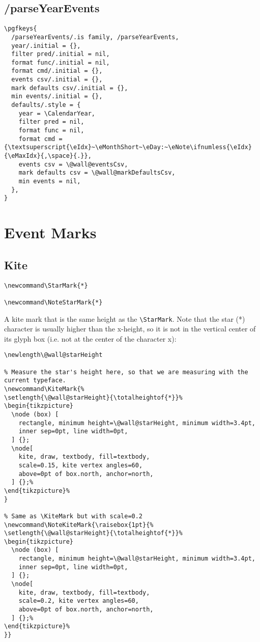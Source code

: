 \documentclass[11pt,oneside]{memoir-article}
\begin{document}
\section{/parseYearEvents}
\label{sec:org3b4e036}

\begin{verbatim}
\pgfkeys{
  /parseYearEvents/.is family, /parseYearEvents,
  year/.initial = {},
  filter pred/.initial = nil,
  format func/.initial = nil,
  format cmd/.initial = {},
  events csv/.initial = {},
  mark defaults csv/.initial = {},
  min events/.initial = {},
  defaults/.style = {
    year = \CalendarYear,
    filter pred = nil,
    format func = nil,
    format cmd = {\textsuperscript{\eIdx}~\eMonthShort~\eDay:~\eNote\ifnumless{\eIdx}{\eMaxIdx}{,\space}{.}},
    events csv = \@wall@eventsCsv,
    mark defaults csv = \@wall@markDefaultsCsv,
    min events = nil,
  },
}
\end{verbatim}

\chapter{Event Marks}
\label{sec:org9c1a6a1}
\section{Kite}
\label{sec:orgb28c6c4}

\begin{verbatim}
\newcommand\StarMark{*}

\newcommand\NoteStarMark{*}
\end{verbatim}

A kite mark that is the same height as the \texttt{\textbackslash{}StarMark}. Note that the star (*)
character is usually higher than the x-height, so it is not in the vertical
center of its glyph box (i.e. not at the center of the character x):

 \frame{*}

\begin{verbatim}
\newlength\@wall@starHeight

% Measure the star's height here, so that we are measuring with the current typeface.
\newcommand\KiteMark{%
\setlength{\@wall@starHeight}{\totalheightof{*}}%
\begin{tikzpicture}
  \node (box) [
    rectangle, minimum height=\@wall@starHeight, minimum width=3.4pt,
    inner sep=0pt, line width=0pt,
  ] {};
  \node[
    kite, draw, textbody, fill=textbody,
    scale=0.15, kite vertex angles=60,
    above=0pt of box.north, anchor=north,
  ] {};%
\end{tikzpicture}%
}

% Same as \KiteMark but with scale=0.2
\newcommand\NoteKiteMark{\raisebox{1pt}{%
\setlength{\@wall@starHeight}{\totalheightof{*}}%
\begin{tikzpicture}
  \node (box) [
    rectangle, minimum height=\@wall@starHeight, minimum width=3.4pt,
    inner sep=0pt, line width=0pt,
  ] {};
  \node[
    kite, draw, textbody, fill=textbody,
    scale=0.2, kite vertex angles=60,
    above=0pt of box.north, anchor=north,
  ] {};%
\end{tikzpicture}%
}}
\end{verbatim}
\end{document}
